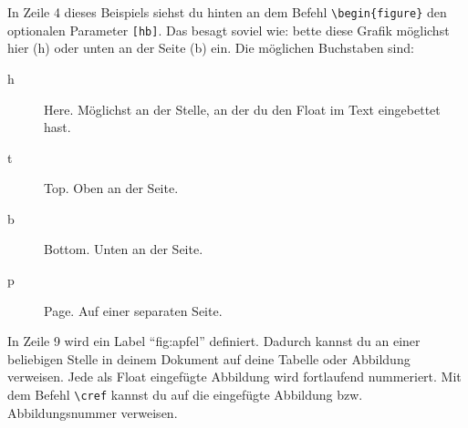 In Zeile 4 dieses Beispiels siehst du hinten an dem Befehl \texttt{\textbackslash begin\{figure\}} den optionalen Parameter \texttt{[hb]}.
Das besagt soviel wie: bette diese Grafik möglichst hier (h) oder unten an der Seite (b) ein. Die möglichen Buchstaben sind:

\begin{description}
\item[h] Here. Möglichst an der Stelle, an der du den Float im Text eingebettet hast.
\item[t] Top. Oben an der Seite.
\item[b] Bottom. Unten an der Seite.
\item[p] Page. Auf einer separaten Seite.
\end{description}

In Zeile 9 wird ein Label \enquote{fig:apfel} definiert. Dadurch kannst du an einer beliebigen Stelle in deinem Dokument auf deine Tabelle oder Abbildung verweisen. Jede als Float eingefügte Abbildung wird fortlaufend nummeriert. Mit dem Befehl \texttt{\textbackslash cref} kannst du auf die eingefügte Abbildung bzw. Abbildungsnummer verweisen.

